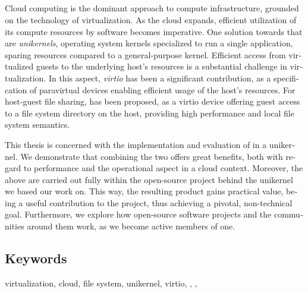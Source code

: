 \begin{otherlanguage}{english}
	\chapter*{\abstractname}
	Cloud computing is the dominant approach to compute infrastructure, grounded
	on the technology of virtualization. As the cloud expands, efficient
	utilization of its compute resources by software becomes imperative. One
	solution towards that are \emph{unikernels}, operating system
	kernels specialized to run a single application, sparing resources compared
	to a general-purpose kernel. Efficient access from virtualized guests to the
	underlying host's resources is a substantial challenge in virtualization.
	In this aspect, \emph{virtio} has been a significant contribution, as a
	specification of paravirtual devices enabling efficient usage of the host's
	resources. For host-guest file sharing, \emph{\viofs{}} has been proposed,
	as a virtio device offering guest access to a file system directory on the
	host, providing high performance and local file system semantics.

	This thesis is concerned with the implementation and evaluation of \viofs{}
	in a unikernel. We demonstrate that combining the two offers great benefits,
	both with regard to performance and the operational aspect in a cloud
	context. Moreover, the above are carried out fully within the open-source
	project behind the unikernel we based our work on. This way, the resulting
	product gains practical value, being a useful contribution to the project,
	thus achieving a pivotal, non-technical goal. Furthermore, we explore how
	open-source software projects and the communities around them work, as we
	become active members of one.

	\section*{Keywords}
	\noindent
	virtualization, cloud, file system, unikernel, virtio, \osv{}, \viofs{},
	\qemu{}
\end{otherlanguage}
